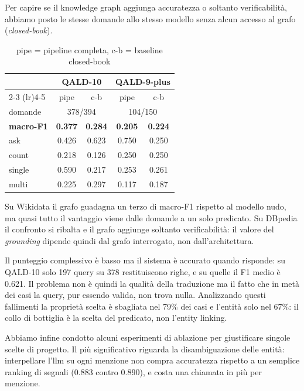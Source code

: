 \documentclass[11pt]{article}
\begin{document}
Per capire se il knowledge graph aggiunga accuratezza o soltanto verificabilità, abbiamo posto le stesse domande allo stesso modello senza alcun accesso al grafo (\textit{closed-book}).
\begin{table}[h]
\centering
\setlength{\tabcolsep}{4pt}
\begin{tabular}{lcccc}
\toprule
 & \multicolumn{2}{c}{QALD-10} & \multicolumn{2}{c}{QALD-9-plus} \\
\cmidrule(lr){2-3} \cmidrule(lr){4-5}
 & pipe & c-b & pipe & c-b \\
\midrule
domande & \multicolumn{2}{c}{378/394} & \multicolumn{2}{c}{104/150} \\
\midrule
\textbf{macro-F1} & \textbf{0.377} & \textbf{0.284} & \textbf{0.205} & \textbf{0.224} \\
ask    & 0.426 & 0.623 & 0.750 & 0.250 \\
count  & 0.218 & 0.126 & 0.250 & 0.250 \\
single & 0.590 & 0.217 & 0.253 & 0.261 \\
multi  & 0.225 & 0.297 & 0.117 & 0.187 \\
\bottomrule
\end{tabular}
\caption*{\footnotesize pipe = pipeline completa, c-b = baseline closed-book}
\end{table}

Su Wikidata il grafo guadagna un terzo di macro-F1 rispetto al modello nudo, ma quasi tutto il vantaggio viene dalle domande a un solo predicato. Su DBpedia il confronto si ribalta e il grafo aggiunge soltanto verificabilità: il valore del \textit{grounding} dipende quindi dal grafo interrogato, non dall'architettura.

Il punteggio complessivo è basso ma il sistema è accurato quando risponde: su QALD-10 solo 197 query su 378 restituiscono righe, e su quelle il F1 medio è 0.621. Il problema non è quindi la qualità della traduzione ma il fatto che in metà dei casi la query, pur essendo valida, non trova nulla. Analizzando questi fallimenti la proprietà scelta è sbagliata nel 79\% dei casi e l'entità solo nel 67\%: il collo di bottiglia è la scelta del predicato, non l'entity linking.

Abbiamo infine condotto alcuni esperimenti di ablazione per giustificare singole scelte di progetto. Il più significativo riguarda la disambiguazione delle entità: interpellare l'llm su ogni menzione non compra accuratezza rispetto a un semplice ranking di segnali ($0.883$ contro $0.890$), e costa una chiamata in più per menzione.
\end{document}
